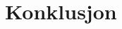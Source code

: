 \documentclass[a4paper,11pt, twocolumn]{article}
\begin{document}
\section{Konklusjon}

\printbibliography
\clearpage
\onecolumn
\appendix


\end{document}
